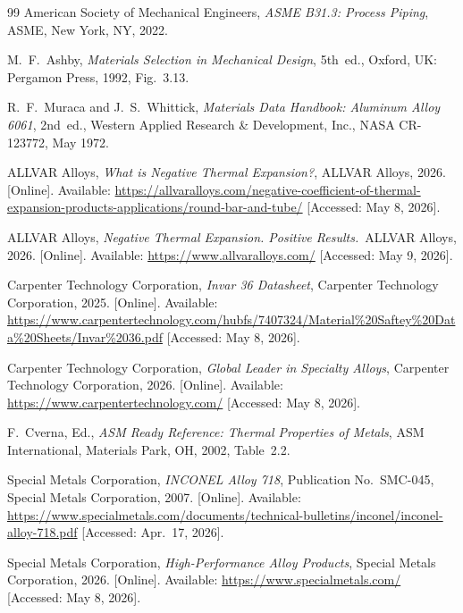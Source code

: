 \documentclass[12pt, letterpaper]{report}%
\begin{document}
\begin{thebibliography}{99}
	American Society of Mechanical Engineers,
	\textit{ASME B31.3: Process Piping},
	ASME, New York, NY, 2022.

	M.\ F.\ Ashby, \textit{Materials Selection in Mechanical Design},
	5th~ed., Oxford, UK: Pergamon Press, 1992, Fig.~3.13.

	R.\ F.\ Muraca and J.\ S.\ Whittick,
	\textit{Materials Data Handbook: Aluminum Alloy 6061}, 2nd~ed.,
	Western Applied Research \& Development, Inc., NASA CR-123772, May 1972.

	ALLVAR Alloys, \textit{What is Negative Thermal Expansion?},
	ALLVAR Alloys, 2026. [Online].
	Available: \url{https://allvaralloys.com/negative-coefficient-of-thermal-expansion-products-applications/round-bar-and-tube/}
	[Accessed: May 8, 2026].

	ALLVAR Alloys, \textit{Negative Thermal Expansion. Positive Results.}\
	ALLVAR Alloys, 2026. [Online].
	Available: \url{https://www.allvaralloys.com/}
	[Accessed: May 9, 2026].

	Carpenter Technology Corporation, \textit{Invar 36 Datasheet},
	Carpenter Technology Corporation, 2025. [Online].
	Available: \url{https://www.carpentertechnology.com/hubfs/7407324/Material%20Saftey%20Data%20Sheets/Invar%2036.pdf}
	[Accessed: May 8, 2026].

	Carpenter Technology Corporation, \textit{Global Leader in Specialty Alloys},
	Carpenter Technology Corporation, 2026. [Online].
	Available: \url{https://www.carpentertechnology.com/}
	[Accessed: May 8, 2026].

	F.\ Cverna, Ed., \textit{ASM Ready Reference: Thermal Properties of Metals},
	ASM International, Materials Park, OH, 2002, Table~2.2.

	Special Metals Corporation, \textit{INCONEL\textregistered{} Alloy 718},
	Publication No.\ SMC-045, Special Metals Corporation, 2007. [Online].
	Available: \url{https://www.specialmetals.com/documents/technical-bulletins/inconel/inconel-alloy-718.pdf}
	[Accessed: Apr.\ 17, 2026].

	Special Metals Corporation, \textit{High-Performance Alloy Products},
	Special Metals Corporation, 2026. [Online].
	Available: \url{https://www.specialmetals.com/}
	[Accessed: May 8, 2026].


\end{thebibliography}
\end{document}

